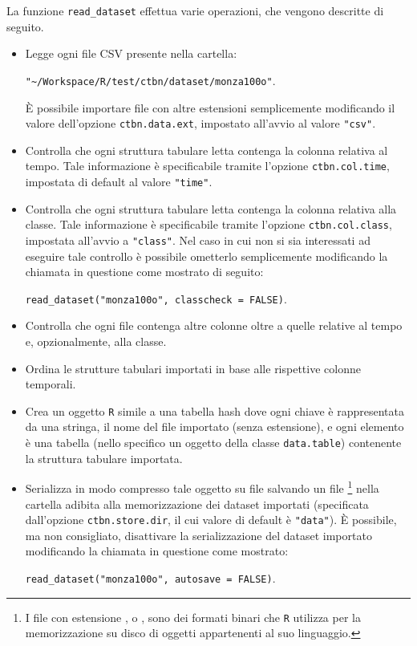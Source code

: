 La funzione \lstinline[language=rstats]{read_dataset} effettua varie operazioni, che vengono descritte di seguito.
\begin{itemize}
	\item Legge ogni file \acs{CSV} presente nella cartella:\par
	\lstinline[language=rstats]{"~/Workspace/R/test/ctbn/dataset/monza100o"}.\par
	\`E possibile importare file con altre estensioni semplicemente modificando il valore dell'opzione \lstinline$ctbn.data.ext$, impostato all'avvio al valore \lstinline[language=rstats]{"csv"}.
	\item Controlla che ogni struttura tabulare letta contenga la colonna relativa al tempo. Tale informazione è specificabile tramite l'opzione \lstinline$ctbn.col.time$, impostata di default al valore \lstinline[language=rstats]{"time"}.
	\item Controlla che ogni struttura tabulare letta contenga la colonna relativa alla classe. Tale informazione è specificabile tramite l'opzione \lstinline$ctbn.col.class$, impostata all'avvio a \lstinline[language=rstats]{"class"}. Nel caso in cui non si sia interessati ad eseguire tale controllo è possibile ometterlo semplicemente modificando la chiamata in questione come mostrato di seguito:\par
	\lstinline[language=rstats]{read_dataset("monza100o", classcheck = FALSE)}.
	\item Controlla che ogni file contenga altre colonne oltre a quelle relative al tempo e, opzionalmente, alla classe.
	\item Ordina le strutture tabulari importati in base alle rispettive colonne temporali.
	\item Crea un oggetto \lstinline$R$ simile a una tabella hash dove ogni chiave è rappresentata da una stringa, il nome del file importato (senza estensione), e ogni elemento è una tabella (nello specifico un oggetto della classe \lstinline$data.table$) contenente la struttura tabulare importata.
	\item Serializza in modo compresso tale oggetto su file salvando un file \footnote{I file con estensione , o , sono dei formati binari che \lstinline$R$ utilizza per la memorizzazione su disco di oggetti appartenenti al suo linguaggio.} nella cartella adibita alla memorizzazione dei dataset importati (specificata dall'opzione \lstinline$ctbn.store.dir$, il cui valore di default è \lstinline[language=rstats]{"data"}). \`E possibile, ma non consigliato, disattivare la serializzazione del dataset importato modificando la chiamata in questione come mostrato:\par
	\lstinline[language=rstats]{read_dataset("monza100o", autosave = FALSE)}.
\end{itemize}

